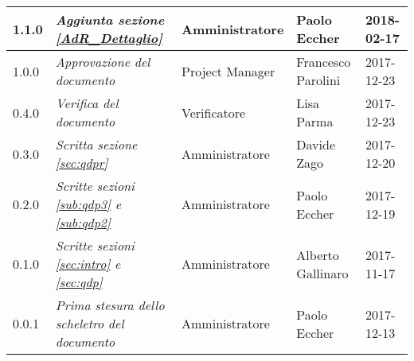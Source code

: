 \begin{longtable}[H]{C{2cm}|C{4cm}|C{3cm}|C{3cm}|R{2cm}}
		1.1.0 & \emph{Aggiunta sezione \ref{AdR_Dettaglio}} & Amministratore &  Paolo Eccher & 2018-02-17 \\
		\hline
		
		1.0.0 & \emph{Approvazione del documento} & Project Manager &  Francesco Parolini & 2017-12-23 \\
		\hline
		
		0.4.0  & \emph{Verifica del documento} & Verificatore & Lisa Parma & 2017-12-23 \\
		\hline
		
		0.3.0 & \emph{Scritta sezione \ref{sec:qdpr}} & Amministratore & Davide Zago & 2017-12-20 \\
		\hline
		
		0.2.0 & \emph{Scritte sezioni \ref{sub:qdp3} e \ref{sub:qdp2}} &  Amministratore & Paolo Eccher & 2017-12-19 \\
		\hline
		
		0.1.0 & \emph{Scritte sezioni \ref{sec:intro} e \ref{sec:qdp}} & Amministratore & Alberto Gallinaro & 2017-11-17 \\
		\hline
		
		0.0.1 & \emph{Prima stesura dello scheletro del documento} & Amministratore & Paolo Eccher &  2017-12-13 \\
		
	\end{longtable}


\clearpage